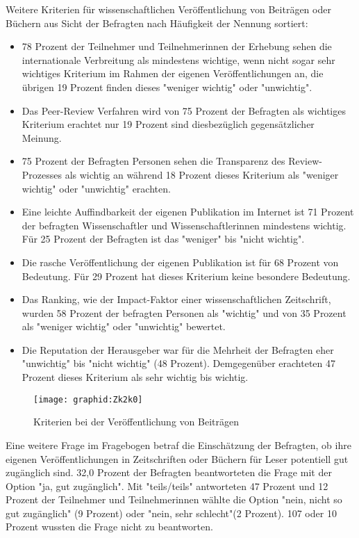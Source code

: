 Weitere Kriterien für wissenschaftlichen Veröffentlichung von Beiträgen oder Büchern aus Sicht der Befragten nach Häufigkeit der Nennung sortiert:
\begin{itemize}
\item 78 Prozent der Teilnehmer und Teilnehmerinnen der Erhebung sehen die internationale Verbreitung als mindestens wichtige, wenn nicht sogar sehr wichtiges Kriterium im Rahmen der eigenen Veröffentlichungen an, die übrigen 19 Prozent finden dieses "weniger wichtig" oder "unwichtig".
\item Das Peer-Review Verfahren wird von 75 Prozent der Befragten als wichtiges Kriterium erachtet nur 19 Prozent sind diesbezüglich gegensätzlicher Meinung.
\item 75 Prozent der Befragten Personen sehen die Transparenz des Review-Prozesses als wichtig an während 18 Prozent dieses Kriterium als "weniger wichtig" oder "unwichtig" erachten.
\item Eine leichte Auffindbarkeit der eigenen Publikation im Internet ist 71 Prozent der befragten Wissenschaftler und Wissenschaftlerinnen mindestens wichtig. Für 25 Prozent der Befragten ist das "weniger" bis "nicht wichtig".
\item Die rasche Veröffentlichung der eigenen Publikation ist für 68 Prozent von Bedeutung. Für 29 Prozent hat dieses Kriterium keine besondere Bedeutung.
\item Das Ranking, wie der Impact-Faktor einer wissenschaftlichen Zeitschrift, wurden 58 Prozent der befragten Personen als "wichtig" und von 35 Prozent als "weniger wichtig" oder "unwichtig" bewertet.
\item Die Reputation der Herausgeber war für die Mehrheit der Befragten eher "unwichtig" bis "nicht wichtig" (48 Prozent). Demgegenüber erachteten 47 Prozent dieses Kriterium als sehr wichtig bis wichtig.
\end{itemize}

\begin{figure}[h!]
\texttt{[image: graphid:Zk2k0]}
\caption{Kriterien bei der Veröffentlichung von Beiträgen}
\end{figure}

Eine weitere Frage im Fragebogen betraf die Einschätzung der Befragten, ob ihre eigenen Veröffentlichungen in Zeitschriften oder Büchern für Leser potentiell gut zugänglich sind. 32,0 Prozent der Befragten beantworteten die Frage mit der Option "ja, gut zugänglich". Mit "teils/teils" antworteten 47 Prozent und 12 Prozent der Teilnehmer und Teilnehmerinnen wählte die Option "nein, nicht so gut zugänglich" (9 Prozent) oder "nein, sehr schlecht"(2 Prozent). 107 oder 10 Prozent wussten die Frage nicht zu beantworten.

